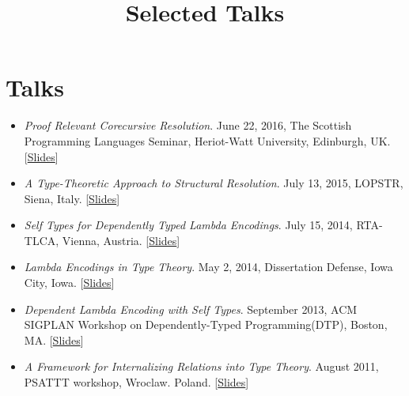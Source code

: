 \documentclass[10pt]{article}
\title{\bfseries\Large Selected Talks}
\date{}
\begin{document}
\maketitle
\vspace{-4em}

\vspace{20pt}
\section*{Talks}
\begin{itemize}
\item \textit{Proof Relevant Corecursive Resolution}. June 22, 2016, The Scottish Programming Languages Seminar, Heriot-Watt University, Edinburgh, UK. [\href{../../document/talks/spls-2016.pdf}{Slides}]

\item \textit{A Type-Theoretic Approach to Structural Resolution}. July 13, 2015, LOPSTR, Siena, Italy. [\href{../../document/talks/lopstr-2015.pdf}{Slides}]

\item \textit{Self Types for Dependently Typed Lambda Encodings}. July 15, 2014, RTA-TLCA, Vienna, Austria. [\href{../../document/talks/rta-tlca-14.pdf}{Slides}]
\item \textit{Lambda Encodings in Type Theory}. May 2, 2014, Dissertation Defense, Iowa City, Iowa. [\href{../../document/talks/thesis-talk.pdf}{Slides}]
\item \textit{Dependent Lambda Encoding with Self Types}. September 2013, ACM SIGPLAN Workshop on Dependently-Typed Programming(DTP), Boston, MA. [\href{../../document/talks/dtp-2013.pdf}{Slides}]

\item \textit{A Framework for Internalizing Relations into Type Theory}. August 2011, PSATTT workshop, Wroclaw. Poland. [\href{../../document/talks/psattt11-talk.pdf}{Slides}]
\end{itemize}
\end{document}
